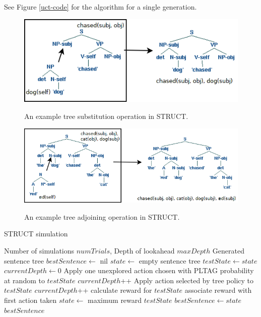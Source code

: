 See Figure \ref{uct-code} for the algorithm for a single generation.

\begin{figure}[t]
\centering
\includegraphics[width= 0.7 \linewidth]{sub-example.png}\label{examples-s}
\caption{An example tree substitution operation in STRUCT.}
\end{figure}

\begin{figure}[t]
\centering
\includegraphics[width= 0.7 \linewidth]{adjoin-example.png}\label{examples-a}
\caption{An example tree adjoining operation in STRUCT.}
\end{figure}

\begin{algorithm}
\caption{STRUCT simulation}\label{uct-code}
\begin{algorithmic}[1]
\REQUIRE Number of simulations $numTrials$, Depth of lookahead $maxDepth$
\ENSURE Generated sentence tree
\STATE $bestSentence \gets$ nil
\STATE $state \gets$ empty sentence tree
		\STATE $testState \gets state$
		\STATE $currentDepth \gets 0$
			\STATE Apply one unexplored action chosen
                        with PLTAG probability at random to $testState$
			\STATE $currentDepth$++
		\ENDIF
			\STATE Apply action selected by tree
                        policy to $testState$
			\STATE $currentDepth$++
		\ENDWHILE
		\STATE calculate reward for $testState$
		\STATE associate reward with first action taken
	\ENDFOR
	\STATE $state \gets$ maximum reward $testState$
		\STATE $bestSentence \gets state$
	\ENDIF
\ENDWHILE
\RETURN $bestSentence$
\end{algorithmic}
\end{algorithm}

